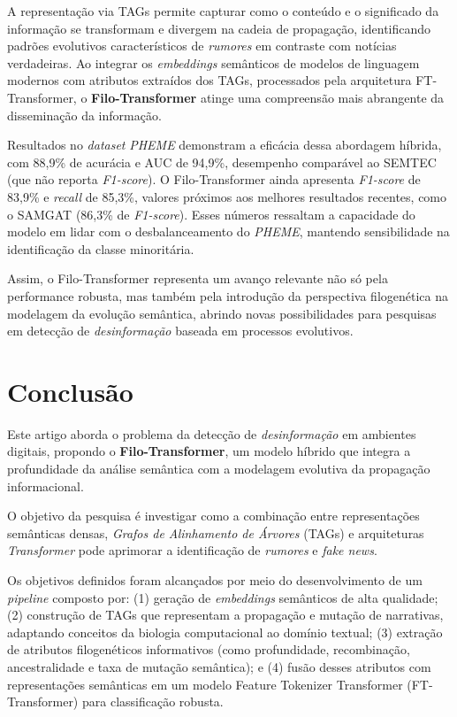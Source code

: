 \documentclass[12pt]{article}
\begin{document}
A representação via TAGs permite capturar como o conteúdo e o significado da informação se transformam e divergem na cadeia de propagação, identificando padrões evolutivos característicos de \textit{rumores} em contraste com notícias verdadeiras. Ao integrar os \textit{embeddings} semânticos de modelos de linguagem modernos com atributos extraídos dos TAGs, processados pela arquitetura FT-Transformer, o \textbf{Filo-Transformer} atinge uma compreensão mais abrangente da disseminação da informação.

Resultados no \textit{dataset} \textit{PHEME} demonstram a eficácia dessa abordagem híbrida, com 88,9\% de acurácia e AUC de 94,9\%, desempenho comparável ao SEMTEC (que não reporta \textit{F1-score}). O Filo-Transformer ainda apresenta \textit{F1-score} de 83,9\% e \textit{recall} de 85,3\%, valores próximos aos melhores resultados recentes, como o SAMGAT (86,3\% de \textit{F1-score}). Esses números ressaltam a capacidade do modelo em lidar com o desbalanceamento do \textit{PHEME}, mantendo sensibilidade na identificação da classe minoritária.

Assim, o Filo-Transformer representa um avanço relevante não só pela performance robusta, mas também pela introdução da perspectiva filogenética na modelagem da evolução semântica, abrindo novas possibilidades para pesquisas em detecção de \textit{desinformação} baseada em processos evolutivos.

\section{Conclusão}
\label{sec:conclusao}

Este artigo aborda o problema da detecção de \textit{desinformação} em ambientes digitais, propondo o \textbf{Filo-Transformer}, um modelo híbrido que integra a profundidade da análise semântica com a modelagem evolutiva da propagação informacional.

O objetivo da pesquisa é investigar como a combinação entre representações semânticas densas, \textit{Grafos de Alinhamento de Árvores} (TAGs) e arquiteturas \textit{Transformer} pode aprimorar a identificação de \textit{rumores} e \textit{fake news}.

Os objetivos definidos foram alcançados por meio do desenvolvimento de um \textit{pipeline} composto por: (1) geração de \textit{embeddings} semânticos de alta qualidade; (2) construção de TAGs que representam a propagação e mutação de narrativas, adaptando conceitos da biologia computacional ao domínio textual; (3) extração de atributos filogenéticos informativos (como profundidade, recombinação, ancestralidade e taxa de mutação semântica); e (4) fusão desses atributos com representações semânticas em um modelo Feature Tokenizer Transformer (FT-Transformer) para classificação robusta.
\end{document}
